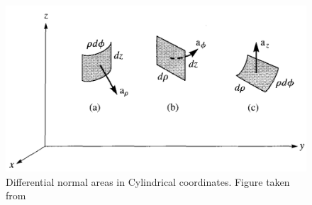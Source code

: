 \documentclass[12pt,a4paper]{article}
\begin{document}
\begin{figure}[htb]
\centering
\includegraphics[scale=0.3]{Figure3-4S.png}
\caption{Differential normal areas in Cylindrical coordinates. Figure taken from~\cite[Figure 3.4, page 56]{Sadiku}}
\label{Cylindrical-differential-area}
\end{figure}
\end{document}
